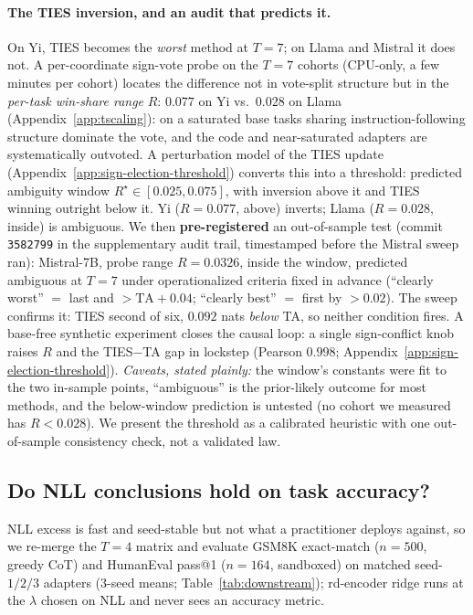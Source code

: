 \paragraph{The TIES inversion, and an audit that predicts it.} On Yi,
TIES becomes the \emph{worst} method at $T = 7$; on Llama and Mistral
it does not. A per-coordinate sign-vote probe on the $T = 7$ cohorts
(CPU-only, a few minutes per cohort) locates the difference not in
vote-split structure but in the \emph{per-task win-share range} $R$:
$0.077$ on Yi vs.\ $0.028$ on Llama (Appendix~\ref{app:tscaling}):
on a saturated base tasks sharing instruction-following structure
dominate the vote, and the code and near-saturated adapters are
systematically outvoted. A perturbation
model of the TIES update (Appendix~\ref{app:sign-election-threshold})
converts this into a threshold: predicted ambiguity window
$R^\star \in [0.025, 0.075]$, with inversion above it and TIES winning
outright below it. Yi ($R = 0.077$, above) inverts; Llama
($R = 0.028$, inside) is ambiguous. We then \textbf{pre-registered} an
out-of-sample test (commit \texttt{3582799} in the supplementary audit
trail, timestamped before the Mistral sweep ran): Mistral-7B, probe
range $R = 0.0326$, inside the window, predicted ambiguous at $T = 7$
under operationalized criteria fixed in advance (``clearly worst'' $=$
last and $> \mathrm{TA} + 0.04$; ``clearly best'' $=$ first by
$> 0.02$). The sweep confirms it: TIES second of six, $0.092$ nats
\emph{below} TA, so neither condition fires. A base-free synthetic
experiment closes the causal loop: a single sign-conflict knob raises
$R$ and the TIES$-$TA gap in lockstep (Pearson $0.998$;
Appendix~\ref{app:sign-election-threshold}). \emph{Caveats, stated
plainly:} the window's constants were fit to the two in-sample points,
``ambiguous'' is the prior-likely outcome for most methods, and the
below-window prediction is untested (no cohort we measured has
$R < 0.028$). We present the threshold as a calibrated heuristic with
one out-of-sample consistency check, not a validated law.

\subsection{Do NLL conclusions hold on task accuracy?}
\label{subsec:exp-downstream-gsm8k}

NLL excess is fast and seed-stable but not what a practitioner
deploys against, so we re-merge the $T = 4$ matrix and evaluate GSM8K
exact-match ($n = 500$, greedy CoT) and HumanEval pass@1 ($n = 164$,
sandboxed) on matched seed-$1/2/3$ adapters ($3$-seed means;
Table~\ref{tab:downstream}); rd-encoder ridge runs at the $\lambda$
chosen on NLL and never sees an accuracy metric.

